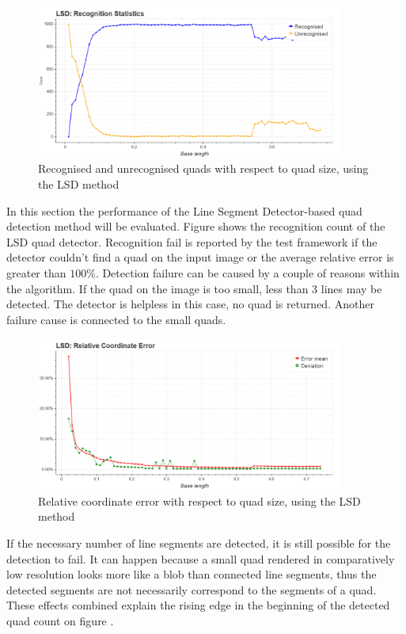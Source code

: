 \begin{figure}[t]
	\centering
	\includegraphics[width=0.9\textwidth]{figures/plots/lsd_rec_unrec_count.png}
	\caption{Recognised and unrecognised quads with respect to quad size, using the LSD method}
	\label{fig:lsdRecCnt}
\end{figure}
In this section the performance of the Line Segment Detector-based quad detection method will be evaluated.
Figure  shows the recognition count of the LSD quad detector.
Recognition fail is reported by the test framework if the detector couldn't find a quad on the input image or the average relative error is greater than $100\%$.
Detection failure can be caused by a couple of reasons within the algorithm.
If the quad on the image is too small, less than 3 lines may be detected.
The detector is helpless in this case, no quad is returned.
Another failure cause is connected to the small quads.
\begin{figure}[ht]
	\centering
	\includegraphics[width=0.9\textwidth]{figures/plots/lsd_relative_coordinate_error.png}
	\caption{Relative coordinate error with respect to quad size, using the LSD method}
	\label{fig:lsdRelCoordErr}
\end{figure}
If the necessary number of line segments are detected, it is still possible for the detection to fail.
It can happen because a small quad rendered in comparatively low resolution looks more like a blob than connected line segments, thus the detected segments are not necessarily correspond to the segments of a quad.
These effects combined explain the rising edge in the beginning of the detected quad count on figure .

